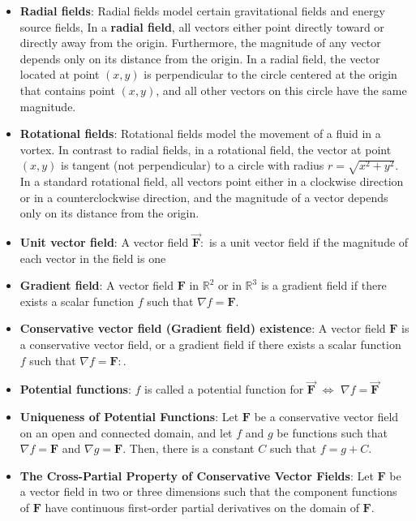 \documentclass{report}
\begin{document}
\begin{itemize}
        \item \textbf{Radial fields}: Radial fields model certain gravitational fields and energy source fields,
            \bigbreak \noindent 
            In a \textbf{radial field}, all vectors either point directly toward or directly away from the origin. Furthermore, the magnitude of any vector depends only on its distance from the origin. In a radial field, the vector located at point $(x,y)$ is perpendicular to the circle centered at the origin that contains point $(x,y)$, and all other vectors on this circle have the same magnitude.
        \item \textbf{Rotational fields}: Rotational fields model the movement of a fluid in a vortex.
            \bigbreak \noindent 
            In contrast to radial fields, in a rotational field, the vector at point $(x,y)$ is tangent (not perpendicular) to a circle with radius $r=\sqrt{x^2+y^2}$. In a standard rotational field, all vectors point either in a clockwise direction or in a counterclockwise direction, and the magnitude of a vector depends only on its distance from the origin.
        \item \textbf{Unit vector field}: A vector field $\vec{\mathbf{F}}:$ is a unit vector field if the magnitude of each vector in the field is one
        \item \textbf{Gradient field}: 
            A vector field $\mathbf{F}$ in $\mathbb{R}^2$ or in $\mathbb{R}^3$ is a gradient field if there exists a scalar function $f$ such that $\nabla f = \mathbf{F}$.
        \item \textbf{Conservative vector field (Gradient field) existence}: A vector field $\mathbf{F}$ is a conservative vector field, or a gradient field if there exists a scalar function $f$ such that $\nabla f = \mathbf{F}:$.
        \item \textbf{Potential functions}:
            $f$ is called a potential function for  $\vec{\mathbf{F}}$ $\iff$ $\nabla f = \vec{\mathbf{F}} $
        \item \textbf{Uniqueness of Potential Functions}:
            Let $\mathbf{F}$ be a conservative vector field on an open and connected domain, and let $f$ and $g$ be functions such that $\nabla f = \mathbf{F}$ and $\nabla g = \mathbf{F}$. Then, there is a constant $C$ such that $f = g + C$.
        \item \textbf{The Cross-Partial Property of Conservative Vector Fields}:
            Let $\mathbf{F}$ be a vector field in two or three dimensions such that the component functions of $\mathbf{F}$ have continuous first-order partial derivatives on the domain of $\mathbf{F}$.

\end{itemize}
\end{document}
